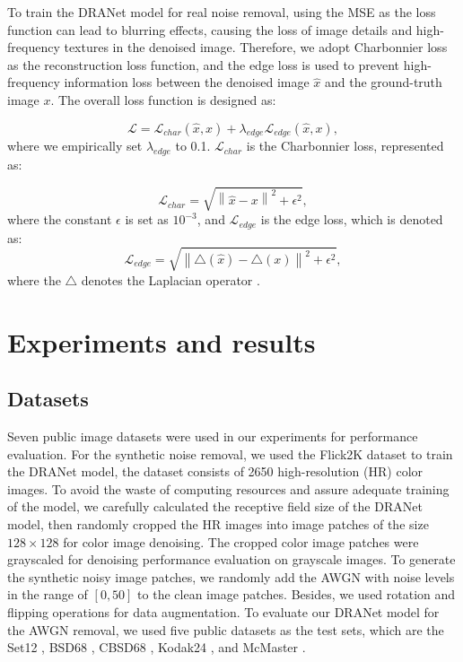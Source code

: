 \documentclass[3p,times]{elsarticle}
\begin{document}
To train the DRANet model for real noise removal, using the MSE as the loss function can lead to blurring effects, causing the loss of image details and high-frequency textures in the denoised image. Therefore, we adopt Charbonnier loss \cite{Lai2017} as the reconstruction loss function, and the edge loss \cite{Jiang2020} is used to prevent high-frequency information loss between the denoised image $\hat{x}$ and the ground-truth image $x$. The overall loss function is designed as:

\begin{equation}
\mathcal{L} = \mathcal{L}_{char}(\hat{x}, x) + \lambda_{edge}\mathcal{L}_{edge}(\hat{x}, x),
\label{eq.2}
\end{equation}
\noindent where we empirically set $\lambda_{edge}$ to 0.1. $\mathcal{L}_{char}$ is the Charbonnier loss, represented as:

\begin{equation}
\mathcal{L}_{char} = \sqrt{\left\|\hat{x} - x\right\|^2 + \epsilon^2},
\end{equation}
\noindent where the constant $\epsilon$ is set as $10^{-3}$, and $\mathcal{L}_{edge}$ is the edge loss, which is denoted as:
\begin{equation}
\mathcal{L}_{edge} = \sqrt{\left\|\bigtriangleup{(\hat{x})} - \bigtriangleup{(x)}\right\|^2 + \epsilon^2},
\end{equation}
\noindent where the $\bigtriangleup$ denotes the Laplacian operator \cite{Kamgar1999}.

\section{Experiments and results}\label{Experiment}
\subsection{Datasets}
Seven public image datasets were used in our experiments for performance evaluation. For the synthetic noise removal, we used the Flick2K dataset \cite{Lim2017} to train the DRANet model, the dataset consists of 2650 high-resolution (HR) color images. To avoid the waste of computing resources and assure adequate training of the model, we carefully calculated the receptive field size of the DRANet model, then randomly cropped the HR images into image patches of the size $128 \times 128$ for color image denoising. The cropped color image patches were grayscaled for denoising performance evaluation on grayscale images. To generate the synthetic noisy image patches, we randomly add the AWGN with noise levels in the range of $[0, 50]$ to the clean image patches. Besides, we used rotation and flipping operations for data augmentation. To evaluate our DRANet model for the AWGN removal, we used five public datasets as the test sets, which are the Set12 \cite{Roth2005}, BSD68 \cite{Roth2005}, CBSD68 \cite{Roth2005}, Kodak24 \cite{Kodak24}, and McMaster \cite{Zhang2011}.
\end{document}
